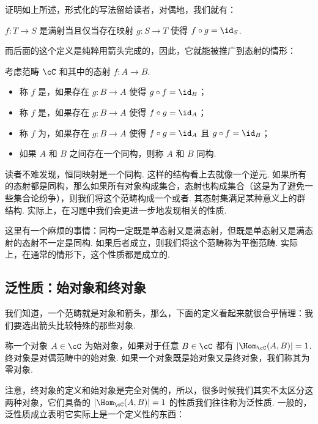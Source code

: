 证明如上所述，形式化的写法留给读者，对偶地，我们就有：

\begin{lemma}{}{}
    $f\colon T \to S$ 是满射当且仅当存在映射 $g\colon S \to T$ 使得 $f \circ g = \id_S$.
\end{lemma}

而后面的这个定义是纯粹用箭头完成的，因此，它就能被推广到态射的情形：

\begin{definition}{}{}
    考虑范畴 $\cC$ 和其中的态射 $f\colon A \to B$.
    \begin{itemize}
        \item 称 $f$ 是，如果存在 $g\colon B \to A$ 使得 $g \circ f = \id_B$；
        \item 称 $f$ 是，如果存在 $g\colon B \to A$ 使得 $f \circ g = \id_A$；
        \item 称 $f$ 为，如果存在 $g\colon B \to A$ 使得 $f \circ g = \id_A$ 且 $g \circ f = \id_B$；
        \item 如果 $A$ 和 $B$ 之间存在一个同构，则称 $A$ 和 $B$ 同构.
    \end{itemize}
\end{definition}

读者不难发现，恒同映射是一个同构. 这样的结构看上去就像一个逆元. 如果所有的态射都是同构，那么如果所有对象构成集合，态射也构成集合（这是为了避免一些集合论纷争），则我们将这个范畴构成一个或者. 其态射集满足某种意义上的群结构. 实际上，在习题中我们会更进一步地发现相关的性质.

这里有一个麻烦的事情：同构一定既是单态射又是满态射，但既是单态射又是满态射的态射不一定是同构. 如果后者成立，则我们将这个范畴称为平衡范畴. 实际上，在通常的情形下，这个性质都是成立的.

\subsection{泛性质：始对象和终对象}

我们知道，一个范畴就是对象和箭头，那么，下面的定义看起来就很合乎情理：我们要选出箭头比较特殊的那些对象.

\begin{definition}{}{}
    称一个对象 $A \in \cC$ 为始对象，如果对于任意 $B \in \cC$ 都有 $|\Hom_\cC (A, B)| = 1$. 终对象是对偶范畴中的始对象. 如果一个对象既是始对象又是终对象，我们称其为零对象.
\end{definition}

注意，终对象的定义和始对象是完全对偶的，所以，很多时候我们其实不太区分这两种对象，它们具备的 $|\Hom_\cC (A, B)| = 1$ 的性质我们往往称为泛性质. 一般的，泛性质成立表明它实际上是一个定义性的东西：

